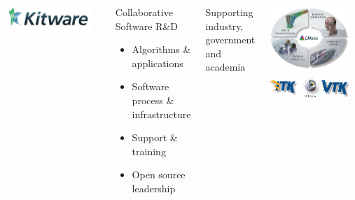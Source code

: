 \documentclass[10pt,aspectratio=169]{beamer}
\begin{document}
\begin{frame}
  \begin{columns}[onlytextwidth]
    \includegraphics[width=0.9\textwidth]{./logos/klogo.png}\\
    \vspace{0.1cm}
    \begin{block}{\color{kitwareblue} Collaborative Software R\&D}
      \begin{itemize}%
        \item Algorithms \& applications
        \item Software process \& infrastructure
        \item Support \& training
        \item Open source leadership
      \end{itemize}
    \end{block}
    \begin{block}{\color{kitwareblue} Supporting industry, government and academia}
    \end{block}
    \centering
    \includegraphics[width=0.9\textwidth]{./logos/kitware_pie.png}
    \includegraphics[width=0.9\textwidth]{./logos/kitware_itk_slicer_vtk_logos.png}
  \end{columns}
\end{frame}
\end{document}
